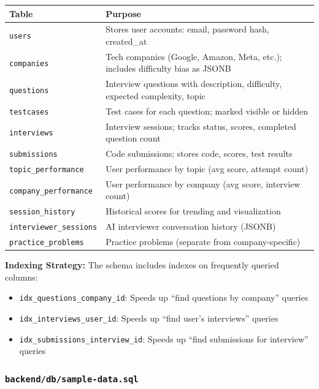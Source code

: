 \documentclass[12pt,a4paper,oneside]{article}
\newcommand{\fileref}[1]{\texttt{#1}}
\newcommand{\database}[1]{\texttt{#1}}
\begin{document}
\begin{table}[H]
\centering
\small
\begin{tabular}{|p{2.5cm}|p{11cm}|}
\hline
\textbf{Table} & \textbf{Purpose} \\
\hline
\database{users} & Stores user accounts: email, password hash, created\_at \\
\hline
\database{companies} & Tech companies (Google, Amazon, Meta, etc.); includes difficulty bias as JSONB \\
\hline
\database{questions} & Interview questions with description, difficulty, expected complexity, topic \\
\hline
\database{testcases} & Test cases for each question; marked visible or hidden \\
\hline
\database{interviews} & Interview sessions; tracks status, scores, completed question count \\
\hline
\database{submissions} & Code submissions; stores code, scores, test results \\
\hline
\database{topic\_performance} & User performance by topic (avg score, attempt count) \\
\hline
\database{company\_performance} & User performance by company (avg score, interview count) \\
\hline
\database{session\_history} & Historical scores for trending and visualization \\
\hline
\database{interviewer\_sessions} & AI interviewer conversation history (JSONB) \\
\hline
\database{practice\_problems} & Practice problems (separate from company-specific) \\
\hline
\end{tabular}
\end{table}

\textbf{Indexing Strategy:} The schema includes indexes on frequently queried columns:
\begin{itemize}
    \item \texttt{idx\_questions\_company\_id}: Speeds up ``find questions by company'' queries
    \item \texttt{idx\_interviews\_user\_id}: Speeds up ``find user's interviews'' queries
    \item \texttt{idx\_submissions\_interview\_id}: Speeds up ``find submissions for interview'' queries
\end{itemize}

\subsubsection{\fileref{backend/db/sample-data.sql}}
\end{document}
